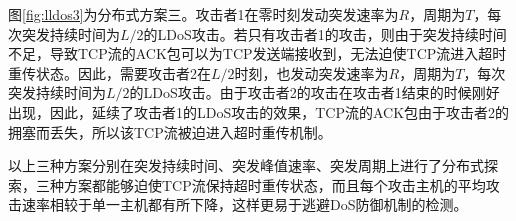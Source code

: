 
图\ref{fig:lldos3}为分布式方案三。攻击者1在零时刻发动突发速率为$R$，周期为$T$，每次突发持续时间为$L/2$的LDoS攻击。若只有攻击者1的攻击，则由于突发持续时间不足，导致TCP流的ACK包可以为TCP发送端接收到，无法迫使TCP流进入超时重传状态。因此，需要攻击者2在$L/2$时刻，也发动突发速率为$R$，周期为$T$，每次突发持续时间为$L/2$的LDoS攻击。由于攻击者2的攻击在攻击者1结束的时候刚好出现，因此，延续了攻击者1的LDoS攻击的效果，TCP流的ACK包由于攻击者2的拥塞而丢失，所以该TCP流被迫进入超时重传机制。

以上三种方案分别在突发持续时间、突发峰值速率、突发周期上进行了分布式探索，三种方案都能够迫使TCP流保持超时重传状态，而且每个攻击主机的平均攻击速率相较于单一主机都有所下降，这样更易于逃避DoS防御机制的检测。

